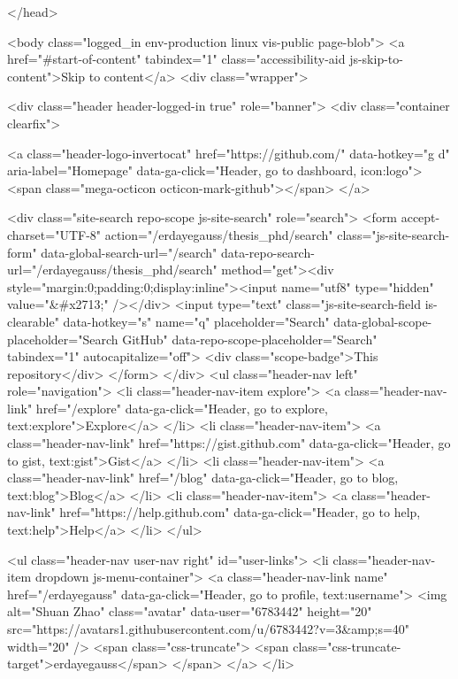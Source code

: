   </head>


  <body class="logged_in  env-production linux vis-public page-blob">
    <a href="#start-of-content" tabindex="1" class="accessibility-aid js-skip-to-content">Skip to content</a>
    <div class="wrapper">
      
      
      
      


        <div class="header header-logged-in true" role="banner">
  <div class="container clearfix">

    <a class="header-logo-invertocat" href="https://github.com/" data-hotkey="g d" aria-label="Homepage" data-ga-click="Header, go to dashboard, icon:logo">
  <span class="mega-octicon octicon-mark-github"></span>
</a>


      <div class="site-search repo-scope js-site-search" role="search">
          <form accept-charset="UTF-8" action="/erdayegauss/thesis_phd/search" class="js-site-search-form" data-global-search-url="/search" data-repo-search-url="/erdayegauss/thesis_phd/search" method="get"><div style="margin:0;padding:0;display:inline"><input name="utf8" type="hidden" value="&#x2713;" /></div>
  <input type="text"
    class="js-site-search-field is-clearable"
    data-hotkey="s"
    name="q"
    placeholder="Search"
    data-global-scope-placeholder="Search GitHub"
    data-repo-scope-placeholder="Search"
    tabindex="1"
    autocapitalize="off">
  <div class="scope-badge">This repository</div>
</form>
      </div>
      <ul class="header-nav left" role="navigation">
        <li class="header-nav-item explore">
          <a class="header-nav-link" href="/explore" data-ga-click="Header, go to explore, text:explore">Explore</a>
        </li>
          <li class="header-nav-item">
            <a class="header-nav-link" href="https://gist.github.com" data-ga-click="Header, go to gist, text:gist">Gist</a>
          </li>
          <li class="header-nav-item">
            <a class="header-nav-link" href="/blog" data-ga-click="Header, go to blog, text:blog">Blog</a>
          </li>
        <li class="header-nav-item">
          <a class="header-nav-link" href="https://help.github.com" data-ga-click="Header, go to help, text:help">Help</a>
        </li>
      </ul>

    
<ul class="header-nav user-nav right" id="user-links">
  <li class="header-nav-item dropdown js-menu-container">
    <a class="header-nav-link name" href="/erdayegauss" data-ga-click="Header, go to profile, text:username">
      <img alt="Shuan Zhao" class="avatar" data-user="6783442" height="20" src="https://avatars1.githubusercontent.com/u/6783442?v=3&amp;s=40" width="20" />
      <span class="css-truncate">
        <span class="css-truncate-target">erdayegauss</span>
      </span>
    </a>
  </li>

